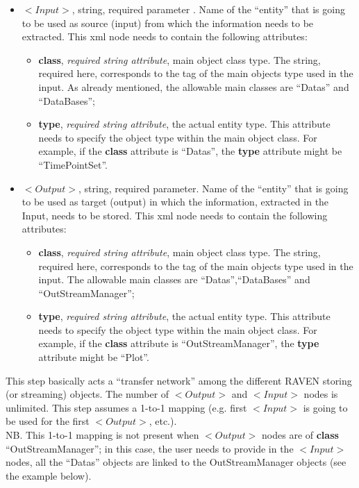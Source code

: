 \begin{itemize}
\item $<Input>$, string, required parameter . Name of the ``entity'' that is going to be used as source (input) from which the information needs to be extracted. This xml node needs to contain the following attributes:
\begin{itemize}
  \item \textbf{class}, \textit{required string attribute}, main object class type. The string, required here, corresponds to the tag of the main objects type used in the input. As already mentioned, the allowable main classes are ``Datas''  and ``DataBases'';
  \item \textbf{type}, \textit{required string attribute}, the actual entity type. This attribute needs to specify the object type within the main object class. For example, if the  \textbf{class} attribute is ``Datas'', the \textbf{type} attribute might be ``TimePointSet''.
\end{itemize}
\item $<Output>$, string, required parameter. Name of the ``entity'' that is going to be used as target (output) in which the information, extracted in the Input, needs to be stored. This xml node needs to contain the following attributes:
\begin{itemize}
  \item \textbf{class}, \textit{required string attribute}, main object class type. The string, required here, corresponds to the tag of the main objects type used in the input. The allowable main classes are ``Datas'',``DataBases'' and ``OutStreamManager'';
  \item \textbf{type}, \textit{required string attribute}, the actual entity type. This attribute needs to specify the object type within the main object class. For example, if the  \textbf{class} attribute is ``OutStreamManager'', the \textbf{type} attribute might be ``Plot''.
\end{itemize}
\end{itemize}
This step basically acts a ``transfer network'' among the different RAVEN storing (or streaming) objects. The number of $<Output>$ and $<Input>$ nodes is unlimited. This step assumes a 1-to-1 mapping (e.g. first $<Input>$ is going to be used for the first $<Output>$, etc.). \\ NB. This 1-to-1 mapping is not present when $<Output>$ nodes are of  \textbf{class} ``OutStreamManager''; in this case, the user needs to provide in the $<Input>$ nodes, all the ``Datas'' objects are linked to the OutStreamManager objects (see the example below).
